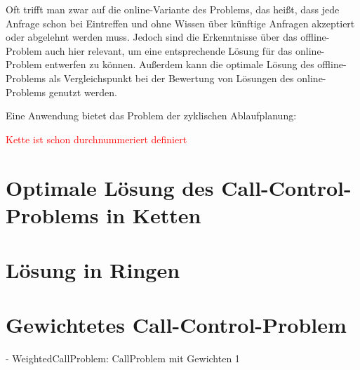 \documentclass[11pt]{article}
\theoremstyle{definition}
\theoremstyle{theorem}
\newcommand\todo[1]{\textcolor{red}{#1}}
\begin{document}
    Oft trifft man zwar auf die online-Variante des Problems, das heißt, dass jede Anfrage schon bei Eintreffen und
    ohne Wissen über künftige Anfragen akzeptiert oder abgelehnt werden muss.
    Jedoch sind die Erkenntnisse über das offline-Problem auch hier relevant, um eine entsprechende Lösung für das
    online-Problem entwerfen zu können.
    Außerdem kann die optimale Lösung des offline-Problems als Vergleichspunkt bei der Bewertung von Lösungen des
    online-Problems genutzt werden.

    Eine Anwendung bietet das Problem der zyklischen Ablaufplanung:

    \todo{Kette ist schon durchnummeriert definiert}

	\section{Optimale Lösung des Call-Control-Problems in Ketten}\label{sec:call-control-in-chains}
	

    \section{Lösung in Ringen}



    \section{Gewichtetes Call-Control-Problem}\label{sec:weiteres}
    - WeightedCallProblem: CallProblem mit Gewichten 1
\end{document}
